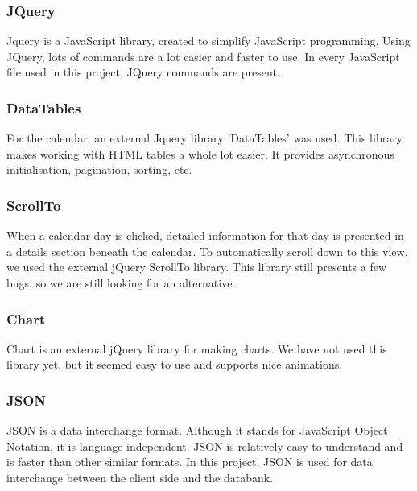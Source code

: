 \subsubsection{JQuery}
Jquery is a JavaScript library, created to simplify JavaScript programming. Using JQuery,
lots of commands are a lot easier and faster to use. In every JavaScript file used in this
project, JQuery commands are present.

\subsubsection{DataTables} 
For the calendar, an external Jquery library 'DataTables' was used. This library makes
working with HTML tables a whole lot easier. It provides asynchronous initialisation,
pagination, sorting, etc.

\subsubsection{ScrollTo}
When a calendar day is clicked, detailed information for that day is presented in a
details section beneath the calendar. To automatically scroll down to this view, we
used the external jQuery ScrollTo library. This library still presents a few bugs, so we
are still looking for an alternative.

\subsubsection{Chart}
Chart is an external jQuery library for making charts. We have not used this library yet,
but it seemed easy to use and supports nice animations.

\subsubsection{JSON}
JSON is a data interchange format. Although it stands for JavaScript Object Notation, it
is language independent. JSON is relatively easy to understand and is faster than other
similar formats. In this project, JSON is used for data interchange between the client
side and the databank. 